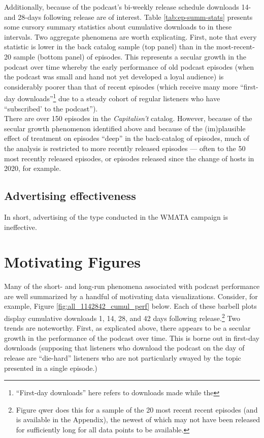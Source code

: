 \documentclass[11pt, letterpaper, twoside]{article}
\begin{document}
Additionally, because of the podcast's bi-weekly release schedule downloads 14- and 28-days following release are of interest. Table \ref{tab:ep-summ-stats} presents some cursory summary statistics about cumulative downloads to in these intervals. Two aggregate phenomena are worth explicating. First, note that every statistic is lower in the back catalog sample (top panel) than in the most-recent-20 sample (bottom panel) of episodes. This represents a secular growth in the podcast over time whereby the early performance of old podcast episodes (when the podcast was small and hand not yet developed a loyal audience) is considerably poorer than that of recent episodes (which receive many more ``first-day downloads''\footnote{``First-day downloads'' here refers to downloads made while the } due to a steady cohort of regular listeners who have ``subscribed' to the podcast'').\\



There are over 150 episodes in the \textit{Capitalisn't} catalog. However, because of the secular growth phenomenon identified above and because of the (im)plausible effect of treatment on episodes ``deep'' in the back-catalog of episodes, much of the analysis is restricted to more recently released episodes --- often to the 50 most recently released episodes, or episodes released since the change of hosts in 2020, for example.

\subsection{Advertising effectiveness}
In short, advertising of the type conducted in the WMATA campaign is ineffective.

\section{Motivating Figures}
Many of the short- and long-run phenomena associated with podcast performance are well summarized by a handful of motivating data visualizations. Consider, for example, Figure \ref{fig:all_1142842_cumul_perf} below. Each of these barbell plots display cumulative downloads 1, 14, 28, and 42 days following release.\footnote{Figure qwer does this for a sample of the 20 most recent recent episodes (and is available in the Appendix), the newest of which may not have been released for sufficiently long for all data points to be available.} Two trends are noteworthy. First, as explicated above, there appears to be a secular growth in the performance of the podcast over time. This is borne out in first-day downloads (supposing that listeners who download the podcast on the day of release are ``die-hard'' listeners who are not particularly swayed by the topic presented in a single episode.)
\end{document}
